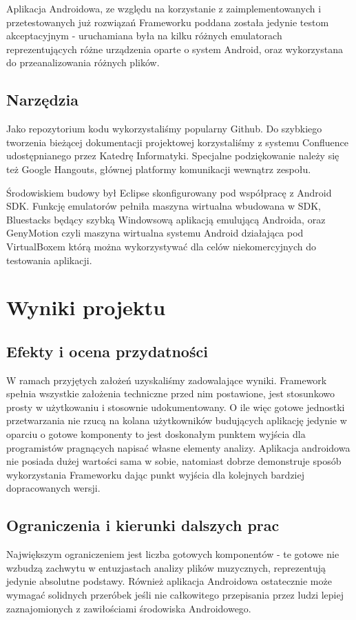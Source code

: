 Aplikacja Androidowa, ze względu na korzystanie z zaimplementowanych i przetestowanych już rozwiązań Frameworku poddana została jedynie testom akceptacyjnym - uruchamiana była na kilku różnych emulatorach reprezentujących różne urządzenia oparte o system Android, oraz wykorzystana do przeanalizowania różnych plików.
\section{Narzędzia}
Jako repozytorium kodu wykorzystaliśmy popularny Github. Do szybkiego tworzenia bieżącej dokumentacji projektowej korzystaliśmy z systemu Confluence udostępnianego przez Katedrę Informatyki. Specjalne podziękowanie należy się też Google Hangouts, głównej platformy komunikacji wewnątrz zespołu.

Środowiskiem budowy był Eclipse skonfigurowany pod współpracę z Android SDK. Funkcję emulatorów pełniła maszyna wirtualna wbudowana w SDK, Bluestacks będący szybką Windowsową aplikacją emulującą Androida, oraz GenyMotion czyli maszyna wirtualna systemu Android działająca pod VirtualBoxem którą można wykorzystywać dla celów niekomercyjnych do testowania aplikacji.

\chapter{Wyniki projektu}
\section{Efekty i ocena przydatności}
W ramach przyjętych założeń uzyskaliśmy zadowalające wyniki. Framework spełnia wszystkie założenia techniczne przed nim postawione, jest stosunkowo prosty w użytkowaniu i stosownie udokumentowany. O ile więc gotowe jednostki przetwarzania nie rzucą na kolana użytkowników budujących aplikację jedynie w oparciu o gotowe komponenty to jest doskonałym punktem wyjścia dla programistów pragnących napisać własne elementy analizy. Aplikacja androidowa nie posiada dużej wartości sama w sobie, natomiast dobrze demonstruje sposób wykorzystania Frameworku dając punkt wyjścia dla kolejnych bardziej dopracowanych wersji.

\section{Ograniczenia i kierunki dalszych prac}
Największym ograniczeniem jest liczba gotowych komponentów - te gotowe nie wzbudzą zachwytu w entuzjastach analizy plików muzycznych, reprezentują jedynie absolutne podstawy. Również aplikacja Androidowa ostatecznie może wymagać solidnych przeróbek jeśli nie całkowitego przepisania przez ludzi lepiej zaznajomionych z zawiłościami środowiska Androidowego.

\nocite{*}

